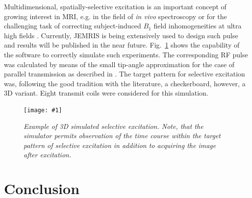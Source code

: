 \documentclass[journal,onecolumn,12pt]{IEEEtran}
\newcommand{\epsfig}[5]{
 \begin{figure}[#4!]
   \begin{center}
    \texttt{[image: \#1]}
    \caption{{\sl #2}\label{#3}}
   \end{center}
 \end{figure}}
\begin{document}
Multidimensional, spatially-selective excitation \cite{pauly} is an important concept of growing interest in MRI,
e.g. in the field of {\it in vivo} spectroscopy or for the challenging task of correcting subject-induced $B_1$ field
inhomogeneities at ultra high fields \cite{ibrahim}. Currently, JEMRIS is being extensively used to design such pulse
and results will be published in the near future. Fig.~\ref{fig:selex} shows the capability of the software to correctly
simulate such experiments.  The corresponding RF pulse was calculated by means of the small tip-angle approximation for
the case of parallel transmission as described in \cite{ullmann}. The target pattern for selective excitation was,
following the good tradition with the literature, a checkerboard, however, a 3D variant. Eight transmit coils were
considered for this simulation.

\epsfig{fig/selex.eps}{Example of 3D simulated selective excitation. Note, that the simulator permits observation of the
  time course within the target pattern of selective excitation in addition to acquiring the image after
  excitation.}{fig:selex}{tp}{0.5}



\section{Conclusion}
\end{document}
